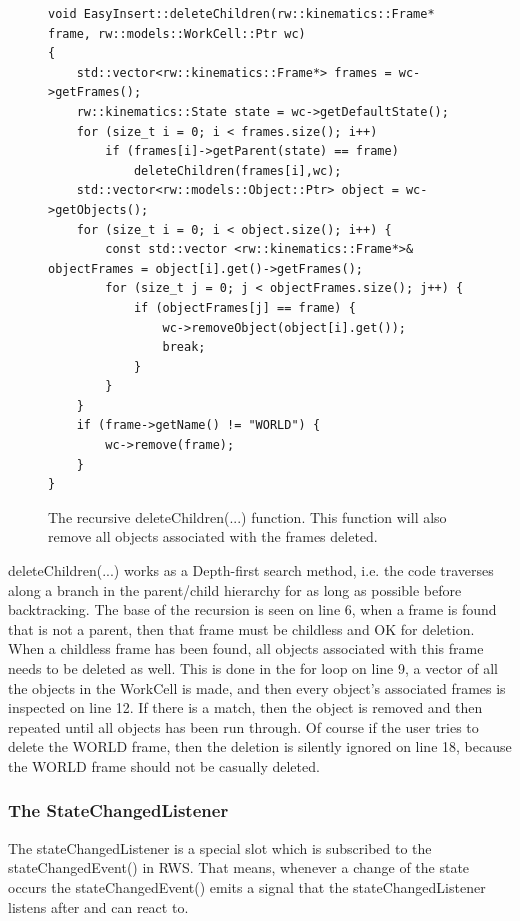 \begin{figure}[h] %
\centering
\lstset{language=C++} 
\begin{lstlisting}[frame=single]  
void EasyInsert::deleteChildren(rw::kinematics::Frame* frame, rw::models::WorkCell::Ptr wc)
{
    std::vector<rw::kinematics::Frame*> frames = wc->getFrames();
    rw::kinematics::State state = wc->getDefaultState();
    for (size_t i = 0; i < frames.size(); i++)
        if (frames[i]->getParent(state) == frame)
            deleteChildren(frames[i],wc);
    std::vector<rw::models::Object::Ptr> object = wc->getObjects();
    for (size_t i = 0; i < object.size(); i++) {
        const std::vector <rw::kinematics::Frame*>& objectFrames = object[i].get()->getFrames();
        for (size_t j = 0; j < objectFrames.size(); j++) {
            if (objectFrames[j] == frame) {
                wc->removeObject(object[i].get());
                break;
            }
        }
    }
    if (frame->getName() != "WORLD") {
        wc->remove(frame);
    }
}
\end{lstlisting}
\caption{The recursive deleteChildren(...) function. This function will also remove all objects associated with the frames deleted.}
\label{fig:eiDeleteChildren} 	
\end{figure}

deleteChildren(...) works as a Depth-first search method, i.e. the code traverses along a branch in the parent/child hierarchy for as long as possible before backtracking. The base of the recursion is seen on line 6, when a frame is found that is not a parent, then that frame must be childless and OK for deletion.
When a childless frame has been found, all objects associated with this frame needs to be deleted as well. This is done in the for loop on line 9, a vector of all the objects in the WorkCell is made, and then every object's associated frames is inspected on line 12. If there is a match, then the object is removed and then repeated until all objects has been run through. Of course if the user tries to delete the WORLD frame, then the deletion is silently ignored on line 18, because the WORLD frame should not be casually deleted.

\subsubsection{The StateChangedListener}
\label{sec:eiStateChangedListener}

The stateChangedListener is a special slot which is subscribed to the stateChangedEvent() in RWS. That means, whenever a change of the state occurs the stateChangedEvent() emits a signal that the stateChangedListener listens after and can react to. 

